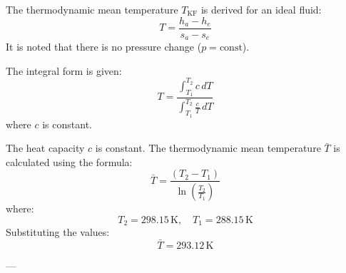 The thermodynamic mean temperature \( T_{\text{KF}} \) is derived for an ideal fluid:  
\[
T = \frac{h_a - h_e}{s_a - s_e}
\]  
It is noted that there is no pressure change (\( p = \text{const} \)).  

The integral form is given:  
\[
T = \frac{\int_{T_1}^{T_2} c \, dT}{\int_{T_1}^{T_2} \frac{c}{T} \, dT}
\]  
where \( c \) is constant.

The heat capacity \( c \) is constant. The thermodynamic mean temperature \( \bar{T} \) is calculated using the formula:  
\[
\bar{T} = \frac{(T_2 - T_1)}{\ln\left(\frac{T_2}{T_1}\right)}
\]  
where:  
\[
T_2 = 298.15 \, \text{K}, \quad T_1 = 288.15 \, \text{K}
\]  
Substituting the values:  
\[
\bar{T} = 293.12 \, \text{K}
\]  

---
